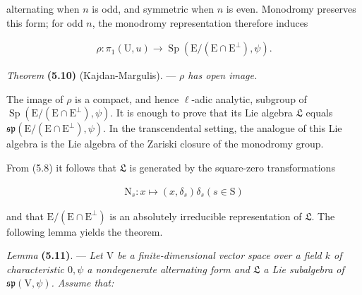 \documentclass[10pt,leqno]{article}
\begin{document}
\noindent alternating when \(n\) is odd, and symmetric when \(n\) is even. Monodromy preserves this form; for odd \(n\), the monodromy representation therefore induces\par

\begin{equation*}\begin{gathered}\rho  : \pi _{1}(\mathrm{U},u) \longrightarrow  \operatorname{Sp}(\mathrm{E}/(\mathrm{E}\cap \mathrm{E}^{\perp }),\psi ).\end{gathered}\end{equation*}

\noindent \emph{Theorem} \textbf{(5.10)} (Kajdan-Margulis). — {\itshape \(\rho \) has open image.}\par

\noindent The image of \(\rho \) is a compact, and hence \(\ell \)-adic analytic, subgroup of \(\operatorname{Sp}(\mathrm{E}/(\mathrm{E}\cap \mathrm{E}^{\perp }),\psi )\). It is enough to prove that its Lie algebra \(\mathfrak{L} \) equals \(\mathfrak{sp}(\mathrm{E}/(\mathrm{E}\cap \mathrm{E}^{\perp }),\psi )\). In the transcendental setting, the analogue of this Lie algebra is the Lie algebra of the Zariski closure of the monodromy group.\par

\noindent From (5.8) it follows that \(\mathfrak{L} \) is generated by the square-zero transformations\par

\begin{equation*}\begin{gathered}\mathrm{N}_{s} : x \longmapsto  (x,\delta _{s})\delta _{s}    (s\in \mathrm{S})\end{gathered}\end{equation*}

\noindent and that \(\mathrm{E}/(\mathrm{E}\cap \mathrm{E}^{\perp })\) is an absolutely irreducible representation of \(\mathfrak{L} \). The following lemma yields the theorem.\par

\noindent \emph{Lemma} \textbf{(5.11)}. — {\itshape Let \(\mathrm{V}\) be a finite-dimensional vector space over a field \(k\) of characteristic \(0, \psi \) a nondegenerate alternating form and \(\mathfrak{L} \) a Lie subalgebra of \(\mathfrak{sp}(\mathrm{V},\psi )\). Assume that:}\par

\par
\end{document}
